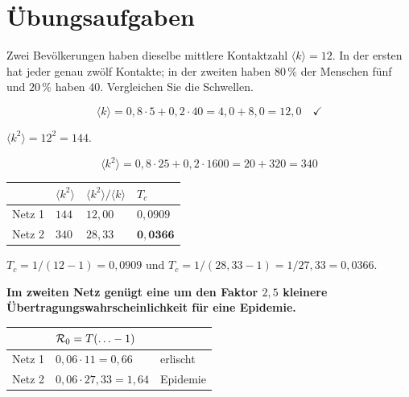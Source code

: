 \section{Übungsaufgaben}

\begin{aufgabe}
Zwei Bevölkerungen haben dieselbe mittlere Kontaktzahl $\langle k\rangle = 12$. In der ersten hat jeder genau zwölf Kontakte; in der zweiten haben $80\,\%$ der Menschen fünf und $20\,\%$ haben $40$. Vergleichen Sie die Schwellen.

\loesung
{}
\[ \langle k\rangle = 0{,}8 \cdot 5 + 0{,}2 \cdot 40 = 4{,}0 + 8{,}0 = 12{,}0 \quad \checkmark \]

 $\langle k^2\rangle = 12^2 = 144$.

\[ \langle k^2\rangle = 0{,}8 \cdot 25 + 0{,}2 \cdot 1600 = 20 + 320 = 340 \]

\begin{center}
\renewcommand{\arraystretch}{1.48}
\begin{tabular}{@{}P{1.8cm}P{1.8cm}P{2.4cm}P{2.0cm}@{}}
\toprule
& $\langle k^2\rangle$ & $\langle k^2\rangle/\langle k\rangle$ & $T_c$\\
\midrule
Netz 1 & $144$ & $12{,}00$ & $0{,}0909$\\
Netz 2 & $340$ & $28{,}33$ & $\mathbf{0{,}0366}$\\
\bottomrule
\end{tabular}
\end{center}

 $T_c = 1/(12-1) = 0{,}0909$ und $T_c = 1/(28{,}33-1) = 1/27{,}33 = 0{,}0366$.

\begin{center}
\begin{minipage}{0.9\textwidth}
\textbf{Im zweiten Netz genügt eine um den Faktor $2{,}5$ kleinere Übertragungswahrscheinlichkeit für eine Epidemie.}
\end{minipage}
\end{center}

\begin{center}
\renewcommand{\arraystretch}{1.48}
\begin{tabular}{@{}P{1.8cm}P{2.4cm}P{2.6cm}@{}}
\toprule
& $\mathcal{R}_0 = T(\ldots-1)$ & \\
\midrule
Netz 1 & $0{,}06 \cdot 11 = 0{,}66$ & \textcolor{gruen}{erlischt}\\
Netz 2 & $0{,}06 \cdot 27{,}33 = 1{,}64$ & \textcolor{akzent}{Epidemie}\\
\bottomrule
\end{tabular}
\end{center}


\end{aufgabe}
